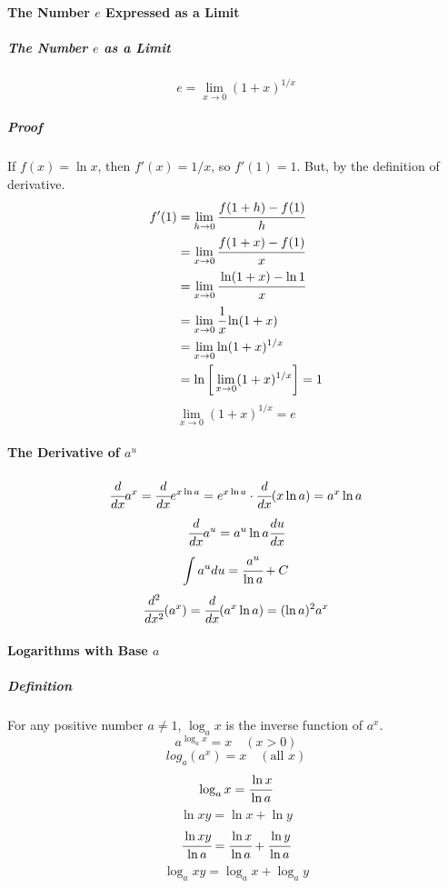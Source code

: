 \documentclass{article}
\begin{document}
            \paragraph{The Number $e$ Expressed as a Limit}
                \subparagraph{The Number $e$ as a Limit}
                    \[e=\lim\limits_{x\to 0}(1+x)^{1/x}\]
                \subparagraph{Proof} If $f(x)=\ln x$, then $f'(x)=1/x$, so $f'(1)=1$. But, by the definition of derivative.
                    \begin{equation}
                        \begin{aligned}
                            f'(1)&=\lim\limits_{h\to 0}\cfrac{f(1+h)-f(1)}{h}\\
                            &=\lim\limits_{x\to 0}\cfrac{f(1+x)-f(1)}{x}\\
                            &=\lim\limits_{x\to 0}\cfrac{\ln (1+x)-\ln 1}{x}\\
                            &=\lim\limits_{x\to 0}\cfrac{1}{x}\ln (1+x)\\
                            &=\lim\limits_{x\to 0}\ln(1+x)^{1/x}\\
                            &=\ln \bigg[\lim\limits_{x\to 0} (1+x)^{1/x}\bigg]=1\\
                        \end{aligned}
                    \end{equation}
                    \[\lim\limits_{x\to 0}(1+x)^{1/x}=e\]
            \paragraph{The Derivative of $a^u$}
                \[\cfrac{d}{dx}a^x=\cfrac{d}{dx}e^{x\ln a}=e^{x\ln a}\cdot\cfrac{d}{dx}(x\ln a)=a^x\ln a\]
                \[\cfrac{d}{dx}a^u=a^u \ln a\cfrac{du}{dx}\]
                \[\int a^u du=\cfrac{a^u}{\ln a}+C\]
                \[\cfrac{d^2}{dx^2}(a^x)=\cfrac{d}{dx}(a^x\ln a)=(\ln a)^2 a^x\]
            \paragraph{Logarithms with Base $a$}
                \subparagraph{Definition} For any positive number $a\ne 1$, $\log_a x$ is the inverse function of $a^x$.
                \[a^{\log_a x}=x\quad(x>0)\]
                \[log_a(a^x)=x\quad (\text{all } x)\]
                \[\log_a x=\cfrac{\ln x}{\ln a}\]
                \[\ln xy=\ln x+\ln y\]
                \[\cfrac{\ln xy}{\ln a}=\cfrac{\ln x}{\ln a}+\cfrac{\ln y}{\ln a}\]
                \[\log_a xy=\log_a x+\log_a y\]
\end{document}
